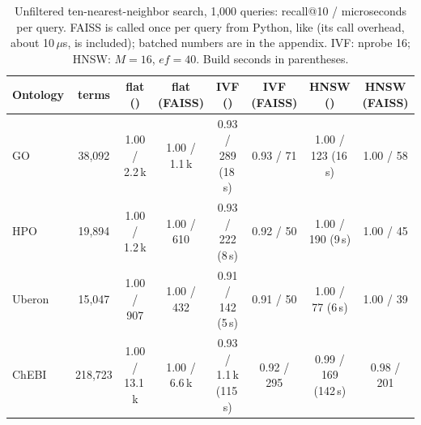 \begin{table}[t]
\caption{Unfiltered ten-nearest-neighbor search, 1,000 queries: recall@10 / microseconds per query. FAISS is called once per query from Python, like \sys{} (its call overhead, about 10\,$\mu$s, is included); batched numbers are in the appendix. IVF: nprobe 16; HNSW: $M{=}16$, $\mathit{ef}{=}40$. Build seconds in parentheses.}
\label{tab-index}
\small
\begin{tabular}{@{}lccccccc@{}}
\toprule
Ontology & terms & flat (\sys{}) & flat (FAISS) & IVF (\sys{}) & IVF (FAISS) & HNSW (\sys{}) & HNSW (FAISS) \\
\midrule
GO & 38,092 & 1.00 / 2.2\,k & 1.00 / 1.1\,k & 0.93 / 289 (18\,s) & 0.93 / 71 & 1.00 / 123 (16\,s) & 1.00 / 58 \\
HPO & 19,894 & 1.00 / 1.2\,k & 1.00 / 610 & 0.93 / 222 (8\,s) & 0.92 / 50 & 1.00 / 190 (9\,s) & 1.00 / 45 \\
Uberon & 15,047 & 1.00 / 907 & 1.00 / 432 & 0.91 / 142 (5\,s) & 0.91 / 50 & 1.00 / 77 (6\,s) & 1.00 / 39 \\
ChEBI & 218,723 & 1.00 / 13.1\,k & 1.00 / 6.6\,k & 0.93 / 1.1\,k (115\,s) & 0.92 / 295 & 0.99 / 169 (142\,s) & 0.98 / 201 \\
\bottomrule
\end{tabular}
\end{table}
